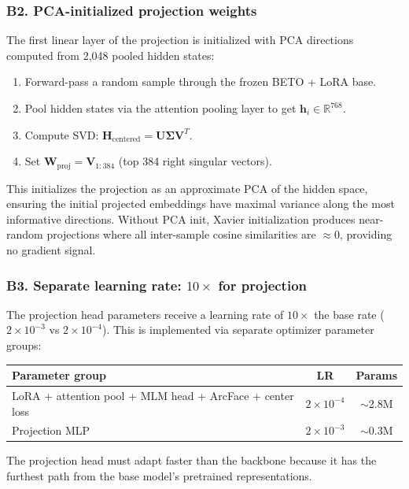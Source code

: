 \documentclass[11pt,a4paper]{article}
\newcommand{\R}{\mathbb{R}}
\begin{document}
\subsubsection{B2. PCA-initialized projection weights}

The first linear layer of the projection is initialized with PCA
directions computed from 2{,}048 pooled hidden states:

\begin{enumerate}
\item Forward-pass a random sample through the frozen BETO + LoRA base.
\item Pool hidden states via the attention pooling layer to get
$\mathbf{h}_i \in \R^{768}$.
\item Compute SVD: $\mathbf{H}_{\text{centered}} = \mathbf{U}\mathbf{\Sigma}\mathbf{V}^T$.
\item Set $\mathbf{W}_{\text{proj}} = \mathbf{V}_{1:384}$ (top 384
right singular vectors).
\end{enumerate}

This initializes the projection as an approximate PCA of the hidden
space, ensuring the initial projected embeddings have maximal variance
along the most informative directions. Without PCA init, Xavier
initialization produces near-random projections where all inter-sample
cosine similarities are $\approx 0$, providing no gradient signal.

\subsubsection{B3. Separate learning rate: $10\times$ for projection}

The projection head parameters receive a learning rate of
$10 \times$ the base rate ($2 \times 10^{-3}$ vs $2 \times 10^{-4}$).
This is implemented via separate optimizer parameter groups:

\begin{center}
\begin{tabular}{lcc}
\toprule
\textbf{Parameter group} & \textbf{LR} & \textbf{Params} \\
\midrule
LoRA + attention pool + MLM head + ArcFace + center loss & $2 \times 10^{-4}$ & $\sim$2.8M \\
Projection MLP & $2 \times 10^{-3}$ & $\sim$0.3M \\
\bottomrule
\end{tabular}
\end{center}

The projection head must adapt faster than the backbone because it has
the furthest path from the base model's pretrained representations.
\end{document}
